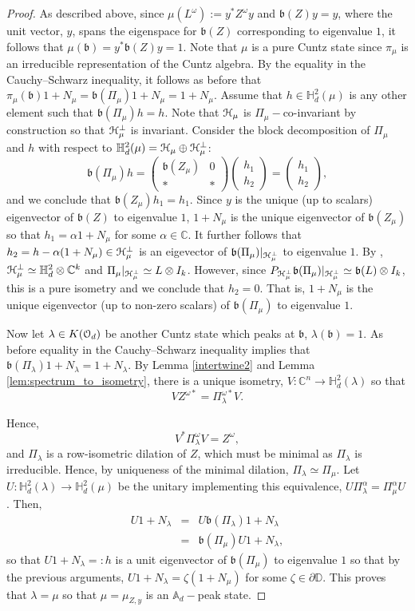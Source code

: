\documentclass{article}
\theoremstyle{definition}
\theoremstyle{remark}
\numberwithin{equation}{section}
\def\ba{\begin{eqnarray*}}
\def\ea{\end{eqnarray*}}
\newcommand{\bpm}{\begin{pmatrix}}
\newcommand{\epm}{\end{pmatrix}}
\newcommand{\la}{\ensuremath{\lambda }}
\newcommand{\om}{\ensuremath{\omega}}
\newcommand{\cuntz}{\ensuremath{\cO_d}}
\def\C{\mathbb{C}}
\def\D{\mathbb{D}}
\def\fb{\mathfrak{b}}
\def\A{\mathbb{A} _d}
\def\hardy{\mathbb{H} ^2 _d}
\begin{document}
\begin{proof}
As described above, since $\mu (L^\om ) := y^* Z^\om y$ and $\fb (Z) y = y$, where the unit vector, $y$, spans the eigenspace for $\fb (Z)$ corresponding to eigenvalue $1$, it follows that $\mu (\fb ) = y^* \fb (Z) y = 1$. Note that $\mu$ is a pure Cuntz state since $\pi _\mu$ is an irreducible representation of the Cuntz algebra. By the equality in the Cauchy--Schwarz inequality, it follows as before that $\pi _\mu (\fb ) 1 + N_\mu = \fb (\Pi _\mu) 1 + N_\mu = 1 + N_\mu$. Assume that $h \in \hardy (\mu )$ is any other element such that $\fb (\Pi _\mu ) h = h$.  Note that ${\mathcal H} _\mu$ is $\Pi _\mu-$co-invariant by construction so that ${\mathcal H} _\mu ^\perp$ is invariant. Consider the block decomposition of $\Pi _\mu$ and $h$ with respect to $\hardy (\mu ) = \cH _\mu \oplus \cH _\mu ^\perp$:
$$ \fb (\Pi _\mu ) h = \bpm \fb (Z_\mu ) & 0 \\ * &  * \epm \bpm h_1 \\ h_2 \epm = \bpm h_1 \\ h_2 \epm, $$ and we conclude that $\fb (Z_\mu )h_1 = h_1$. Since $y$ is the unique (up to scalars) eigenvector of $\fb (Z)$ to eigenvalue $1$, $1 + N_\mu$ is the unique eigenvector of $\fb (Z_\mu )$ so that $h_1 = \alpha 1 + N_\mu$ for some $\alpha \in \C$. It further follows that $h_2 = h - \alpha (1 + N_\mu ) \in {\mathcal H} _\mu ^\perp$ is an eigevector of $\fb (\Pi _\mu ) | _{\cH _\mu ^\perp}$ to eigenvalue $1$. By \cite[Corollary 5.3]{DKS-finrow}, $\cH _\mu ^\perp \simeq \hardy \otimes \C ^k$ and $\Pi _\mu | _{{\mathcal H} _\mu ^\perp} \simeq L \otimes I_k$. However, since $P_{\cH_{\mu}^{\perp}} \fb (\Pi _\mu ) | _{\cH _\mu ^\perp} \simeq \fb (L) \otimes I_k$, this is a pure isometry and we conclude that $h_2 =0$. That is, $1 + N_\mu$ is the unique eigenvector (up to non-zero scalars) of $\fb (\Pi _\mu )$ to eigenvalue $1$.


Now let $\la \in K(\cuntz)$ be another Cuntz state which peaks at $\fb$, $\la (\fb ) =1$. As before equality in the Cauchy--Schwarz inequality implies that $\fb (\Pi _\la ) 1 + N_\la = 1 + N_\la$. By Lemma \ref{intertwine2} and Lemma \ref{lem:spectrum_to_isometry}, there is a unique isometry, $V : \C ^n \rightarrow \hardy (\la )$ so that 
$$ V Z^{\om *} = \Pi _\la ^{\om *} V. $$ 


Hence, 
$$ V^* \Pi _\la ^\om V = Z^\om, $$ and $\Pi _\la$ is a row-isometric dilation of $Z$, which must be minimal as $\Pi _\la$ is irreducible. Hence, by uniqueness of the minimal dilation, $\Pi _\la \simeq \Pi _\mu$. Let $U : \hardy (\la ) \rightarrow \hardy (\mu)$ be the unitary implementing this equivalence, $U \Pi _\la ^\alpha = \Pi _\mu ^\alpha U$. Then,
\ba U 1 + N_\la & = & U \fb (\Pi _\la ) 1 + N_\la \\
& = & \fb (\Pi _\mu ) U 1 + N_\la, \ea so that $U 1 + N_\la =:h$ is a unit eigenvector of $\fb (\Pi _\mu )$ to eigenvalue $1$ so that by the previous arguments, $U 1 + N_\la = \zeta (1 + N_\mu )$ for some $\zeta \in \partial \D$. This proves that $\la = \mu$ so that $\mu = \mu _{Z,y}$ is an $\A-$peak state. 
\end{proof} 
\end{document}
